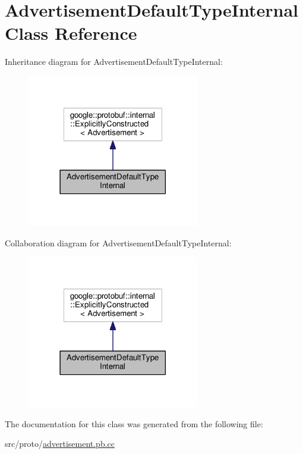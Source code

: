 \hypertarget{class_advertisement_default_type_internal}{}\section{Advertisement\+Default\+Type\+Internal Class Reference}
\label{class_advertisement_default_type_internal}


Inheritance diagram for Advertisement\+Default\+Type\+Internal\+:
\nopagebreak
\begin{figure}[H]
\begin{center}
\leavevmode
\includegraphics[width=213pt]{class_advertisement_default_type_internal__inherit__graph}
\end{center}
\end{figure}


Collaboration diagram for Advertisement\+Default\+Type\+Internal\+:
\nopagebreak
\begin{figure}[H]
\begin{center}
\leavevmode
\includegraphics[width=213pt]{class_advertisement_default_type_internal__coll__graph}
\end{center}
\end{figure}


The documentation for this class was generated from the following file\+:\begin{DoxyCompactItemize}
\item 
src/proto/\hyperlink{advertisement_8pb_8cc}{advertisement.\+pb.\+cc}\end{DoxyCompactItemize}

